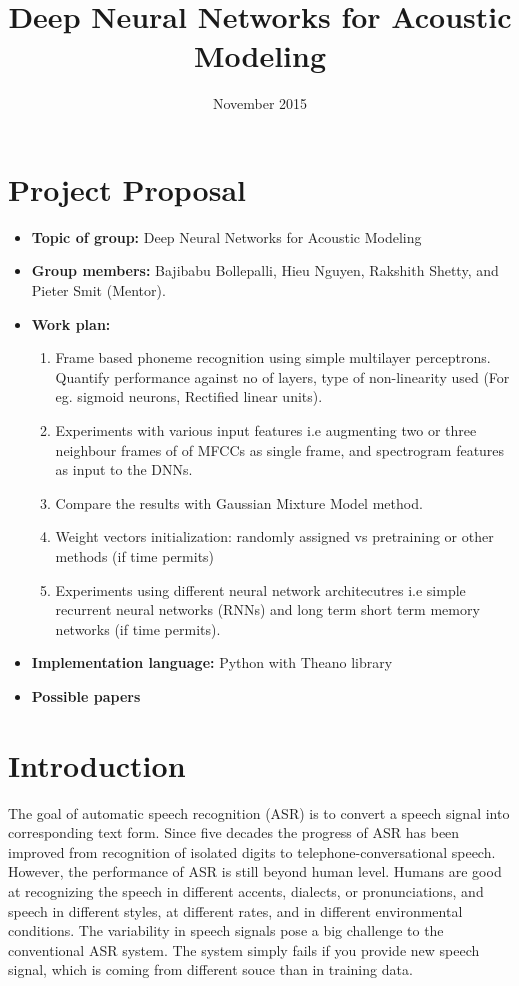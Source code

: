 \documentclass{article}
\title{Deep Neural Networks for Acoustic Modeling}
\author{}
\date{November 2015}
\begin{document}
\maketitle

\section{Project Proposal}
\begin{itemize}
 \item \textbf{Topic of group:} Deep Neural Networks for Acoustic Modeling
 \item \textbf{Group members:} Bajibabu Bollepalli,  Hieu Nguyen,  Rakshith Shetty, and Pieter Smit (Mentor).
 \item \textbf{Work plan:}
   \begin{enumerate}
   \item Frame based phoneme recognition using simple multilayer perceptrons. Quantify performance against no of layers, type of non-linearity used (For eg. sigmoid neurons, Rectified linear units).
   \item Experiments with various input features i.e augmenting two or three neighbour frames of of MFCCs as single frame, and spectrogram features as input to the DNNs.
   \item Compare the results with Gaussian Mixture Model method.
   \item Weight vectors initialization: randomly assigned vs pretraining or other methods (if time permits)
   \item Experiments using different neural network architecutres i.e simple recurrent neural networks (RNNs) and long term short term memory networks (if time permits).
   \end{enumerate}
 \item \textbf{Implementation language:} Python with Theano library
 \item \textbf{Possible papers}
 \citep{Hinton2012, Alex2013, Mohamed2012}
\end{itemize}


\section{Introduction}
The goal of automatic speech recognition (ASR) is to convert a speech signal into corresponding text form. Since five decades the progress of ASR has been improved from recognition of isolated digits to telephone-conversational speech. However, the performance of ASR is still beyond human level. Humans are good at recognizing the speech in different accents, dialects, or pronunciations, and speech in different styles, at different rates, and in different environmental conditions. The variability in speech signals pose a big challenge to the conventional ASR system. The system simply fails if you provide new speech signal, which is coming from different souce than in training data. 
\end{document}
